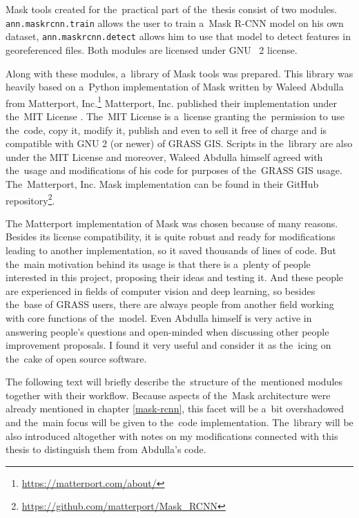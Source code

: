 Mask  tools created for the~practical part of the~thesis consist of 
two modules. \verb|ann.maskrcnn.train| allows the user to train a~Mask R-CNN model 
on his own dataset, \verb|ann.maskrcnn.detect| allows him to use that model to 
detect features in georeferenced files. Both modules are licensed under GNU
~2 license.

Along with these modules, a~library of Mask  tools was prepared. This 
library was heavily based on a~Python implementation of Mask  written 
by Waleed Abdulla from Matterport, 
Inc.\footnote{\url{https://matterport.com/about/}}  Matterport, Inc. published 
their implementation under the~MIT License \cite{mit}. The~MIT License is
a~license granting the~permission to use the~code, copy it, modify it, publish and 
even to sell it free of charge and is compatible with GNU  
2 (or newer) \cite{gplv2} of GRASS GIS. Scripts in the~library are also under 
the MIT License and moreover, Waleed Abdulla himself agreed with the~usage and 
modifications of his code for purposes of the~GRASS GIS usage. The~Matterport, 
Inc. Mask  implementation can be found in their GitHub 
repository\footnote{\url{https://github.com/matterport/Mask\_RCNN}}.

The Matterport implementation of Mask  was chosen because of many 
reasons. Besides its license compatibility, it is quite robust and ready for 
modifications leading to another implementation, so it saved thousands of lines 
of code. But the~main motivation behind its usage is that there is a~plenty of 
people interested in this project, proposing their ideas and testing it. And 
these people are experienced in fields of computer vision and deep learning, so 
besides the~base of GRASS  users, there are always people from another 
field working with core functions of the~model. Even Abdulla himself is very 
active in answering people's questions and open-minded when discussing other 
people improvement proposals. I found it very useful and consider it as
the~icing on the~cake of open source software.

The following text will briefly describe the~structure of the~mentioned modules 
together with their workflow. Because aspects of the~Mask  
architecture were already mentioned in chapter \ref{mask-rcnn}, this facet will 
be a~bit overshadowed and the~main focus will be given to the~code 
implementation. The~library will be also introduced altogether with notes on my 
modifications connected with this thesis to distinguish them from Abdulla's 
code.

